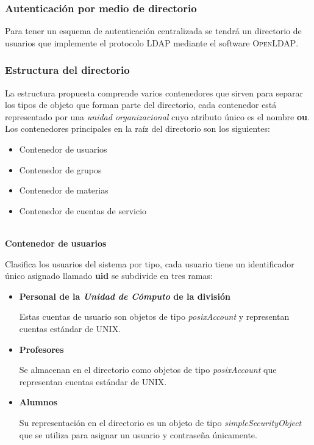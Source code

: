         \subsubsection {Autenticaci\'{o}n por medio de directorio}

Para tener un esquema de autenticaci\'{o}n centralizada se tendr\'{a} un directorio de usuarios que implemente el protocolo LDAP mediante el software \textsc{OpenLDAP}.

        \subsubsection {Estructura del directorio}

La estructura propuesta comprende varios contenedores que sirven para separar los tipos de objeto que forman parte del directorio, cada contenedor est\'{a} representado por una \textit{unidad organizacional} cuyo atributo \'{u}nico es el nombre \textbf{ou}. Los contenedores principales en la ra\'{i}z del directorio son los siguientes:

\begin{itemize}
  \item Contenedor de usuarios
  \item Contenedor de grupos
  \item Contenedor de materias
  \item Contenedor de cuentas de servicio
\end{itemize}

\textbf{\\ Contenedor de usuarios \\}

Clasifica los usuarios del sistema por tipo, cada usuario tiene un identificador \'{u}nico asignado llamado \textbf{uid} se subdivide en tres ramas:

\begin{itemize}

  \item \textbf{Personal de la \textit{Unidad de C\'{o}mputo} de la divisi\'{o}n}

  Estas cuentas de usuario son objetos de tipo \textit{posixAccount} y representan cuentas est\'{a}ndar de \textsc{UNIX}.

  \item \textbf{Profesores}

  Se almacenan en el directorio como objetos de tipo \textit{posixAccount} que representan cuentas est\'{a}ndar de \textsc{UNIX}.

  \item \textbf{Alumnos}

  Su representaci\'{o}n en el directorio es un objeto de tipo \textit{simpleSecurityObject} que se utiliza para asignar un usuario y contrase\~{n}a \'{u}nicamente.

\end{itemize}

